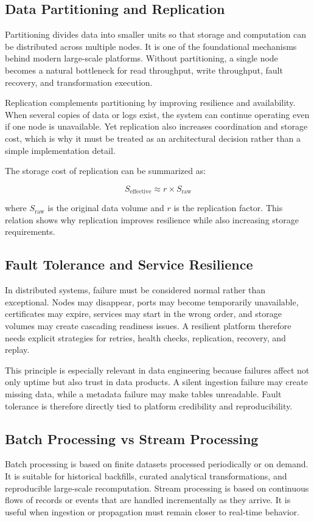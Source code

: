 \subsection{Data Partitioning and Replication}
Partitioning divides data into smaller units so that storage and computation can be distributed across multiple nodes. It is one of the foundational mechanisms behind modern large-scale platforms. Without partitioning, a single node becomes a natural bottleneck for read throughput, write throughput, fault recovery, and transformation execution.

Replication complements partitioning by improving resilience and availability. When several copies of data or logs exist, the system can continue operating even if one node is unavailable. Yet replication also increases coordination and storage cost, which is why it must be treated as an architectural decision rather than a simple implementation detail.

The storage cost of replication can be summarized as:

\[
S_{\text{effective}} \approx r \times S_{\text{raw}}
\]

where $S_{\text{raw}}$ is the original data volume and $r$ is the replication factor. This relation shows why replication improves resilience while also increasing storage requirements.

\subsection{Fault Tolerance and Service Resilience}
In distributed systems, failure must be considered normal rather than exceptional. Nodes may disappear, ports may become temporarily unavailable, certificates may expire, services may start in the wrong order, and storage volumes may create cascading readiness issues. A resilient platform therefore needs explicit strategies for retries, health checks, replication, recovery, and replay.

This principle is especially relevant in data engineering because failures affect not only uptime but also trust in data products. A silent ingestion failure may create missing data, while a metadata failure may make tables unreadable. Fault tolerance is therefore directly tied to platform credibility and reproducibility.

\subsection{Batch Processing vs Stream Processing}
Batch processing is based on finite datasets processed periodically or on demand. It is suitable for historical backfills, curated analytical transformations, and reproducible large-scale recomputation. Stream processing is based on continuous flows of records or events that are handled incrementally as they arrive. It is useful when ingestion or propagation must remain closer to real-time behavior.


